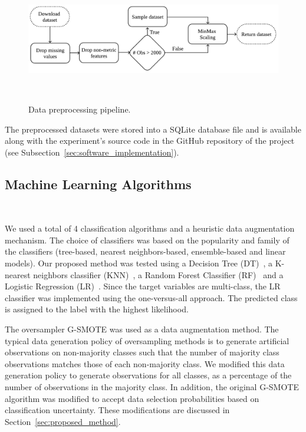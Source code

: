\documentclass[preprint, 12pt]{elsarticle}
\begin{document}
\begin{figure}[H]
	\centering
	\includegraphics[width=1\linewidth]{../analysis/data_preprocessing}
    \caption{%
        Data preprocessing pipeline.
    }~\label{fig:data_preprocessing}
\end{figure}

The preprocessed datasets were stored into a SQLite database file and is
available along with the experiment's source code in the GitHub repository of
the project (see Subsection~\ref{sec:software_implementation}).
 
\subsection{Machine Learning Algorithms}~\label{sec:machine_learning_algorithms}

We used a total of 4 classification algorithms and a heuristic data
augmentation mechanism. The choice of classifiers was based on the popularity
and family of the classifiers (tree-based, nearest neighbors-based,
ensemble-based and linear models). Our proposed method was tested using a
Decision Tree (DT)~\cite{Wu1975}, a K-nearest neighbors classifier
(KNN)~\cite{Cover1967}, a Random Forest Classifier (RF)~\cite{Ho1995} and a
Logistic Regression (LR)~\cite{Nelder1972}. Since the target variables are
multi-class, the LR classifier was implemented using the one-versus-all
approach. The predicted class is assigned to the label with the highest
likelihood.
 
The oversampler G-SMOTE was used as a data augmentation method. The typical
data generation policy of oversampling methods is to generate artificial
observations on non-majority classes such that the number of majority class
observations matches those of each non-majority class. We modified this data
generation policy to generate observations for all classes, as a percentage of
the number of observations in the majority class. In addition, the original
G-SMOTE algorithm was modified to accept data selection probabilities based on
classification uncertainty. These modifications are discussed in
Section~\ref{sec:proposed_method}.
\end{document}
